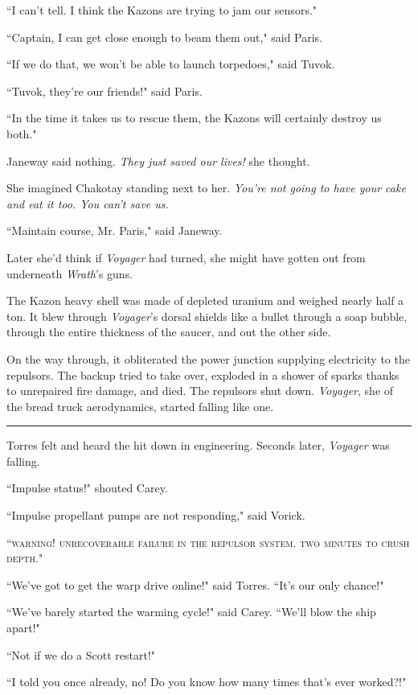 \documentclass[twoside,letterpaper,12pt]{memoir}
\begin{document}
``I can't tell. I think the Kazons are trying to jam our sensors."

``Captain, I can get close enough to beam them out," said Paris.

``If we do that, we won't be able to launch torpedoes," said Tuvok.

``Tuvok, they're our friends!" said Paris.

``In the time it takes us to rescue them, the Kazons will certainly destroy us both."

Janeway said nothing. \textit{They just saved our lives!} she thought.

She imagined Chakotay standing next to her. \textit{You're not going to have your cake and eat it too. You can't save us.}

``Maintain course, Mr. Paris," said Janeway.

Later she'd think if \textit{Voyager} had turned, she might have gotten out from underneath \textit{Wrath}'s guns.

The Kazon heavy shell was made of depleted uranium and weighed nearly half a ton. It blew through \textit{Voyager}'s dorsal shields like a bullet through a soap bubble, through the entire thickness of the saucer, and out the other side.

On the way through, it obliterated the power junction supplying electricity to the repulsors. The backup tried to take over, exploded in a shower of sparks thanks to unrepaired fire damage, and died. The repulsors shut down. \textit{Voyager}, she of the bread truck aerodynamics, started falling like one.

\fancybreak{\rule{3cm}{0.4 pt}}
Torres felt and heard the hit down in engineering. Seconds later, \textit{Voyager} was falling.

``Impulse status!" shouted Carey.

``Impulse propellant pumps are not responding," said Vorick.

``\textsc{warning! unrecoverable failure in the repulsor system. two minutes to crush depth.}"

``We've got to get the warp drive online!" said Torres. ``It's our only chance!"

``We've barely started the warming cycle!" said Carey. ``We'll blow the ship apart!"

``Not if we do a Scott restart!"

``I told you once already, no! Do you know how many times that's ever worked?!"
\end{document}
